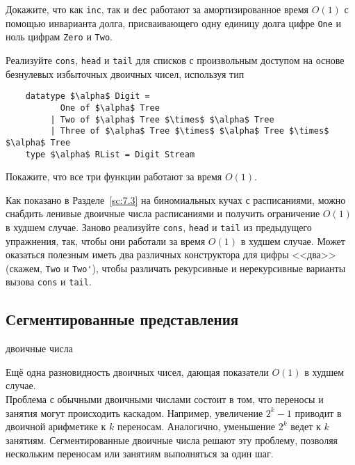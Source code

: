 \ifanswers
\begin{frame}[fragile]{}
\begin{exercise}\label{ex:9.8}
  Докажите, что как \lstinline!inc!, так и \lstinline!dec! работают за
  амортизированное время $O(1)$ с помощью инварианта долга,
  присваивающего одну единицу долга цифре \lstinline!One! и ноль цифрам
  \lstinline!Zero! и \lstinline!Two!.
\end{exercise}

\begin{exercise}\label{ex:9.9}
  Реализуйте \lstinline!cons!, \lstinline!head! и \lstinline!tail! для
  списков с произвольным доступом на основе безнулевых избыточных
  двоичных чисел, используя тип
  \begin{lstlisting}
    datatype $\alpha$ Digit =
           One of $\alpha$ Tree
         | Two of $\alpha$ Tree $\times$ $\alpha$ Tree
         | Three of $\alpha$ Tree $\times$ $\alpha$ Tree $\times$ $\alpha$ Tree
    type $\alpha$ RList = Digit Stream
  \end{lstlisting}
  Покажите, что все три функции работают за время $O(1)$.
\end{exercise}

\begin{exercise}\label{ex:9.10}
  Как показано в Разделе~\ref{sc:7.3} на биномиальных кучах с
  расписаниями, можно снабдить ленивые двоичные числа расписаниями и
  получить ограничение $O(1)$ в худшем случае. Заново реализуйте
  \lstinline!cons!, \lstinline!head! и \lstinline!tail! из предыдущего
  упражнения, так, чтобы они работали за время $O(1)$ в худшем
  случае. Может оказаться полезным иметь два различных конструктора
  для цифры <<два>> (скажем, \lstinline!Two! и \lstinline!Two'!),
  чтобы различать рекурсивные и нерекурсивные варианты вызова \lstinline!cons!
  и \lstinline!tail!.
\end{exercise}
\end{frame}
\fi

\subsection{Сегментированные представления}
\label{sc:9.2.4}

\begin{frame}[fragile]{ двоичные
  числа}


Ещё одна разновидность двоичных чисел, дающая показатели $O(1)$ в
худшем случае.\\

 Проблема с обычными двоичными числами состоит в том, что
переносы и занятия могут происходить каскадом. Например, увеличение
$2^k - 1$ приводит в двоичной арифметике к $k$ переносам. Аналогично,
уменьшение $2^k$ ведет к $k$ занятиям. Сегментированные двоичные числа
решают эту проблему, позволяя нескольким переносам или занятиям
выполняться за один шаг.\\

\end{frame}

